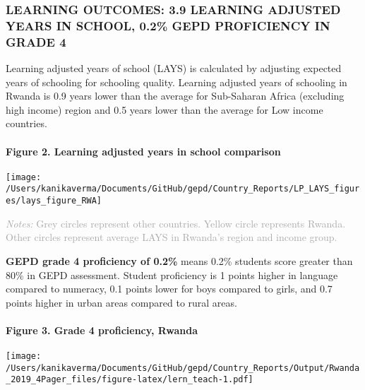 \documentclass[
  twocolumn]{article}
\begin{document}
\hypertarget{learning-outcomes-3.9-learning-adjusted-years-in-school-0.2-gepd-proficiency-in-grade-4}{%
\subsubsection{\texorpdfstring{\textbf{LEARNING OUTCOMES: 3.9 LEARNING
ADJUSTED YEARS IN SCHOOL, 0.2\% GEPD PROFICIENCY IN GRADE
4}}{LEARNING OUTCOMES: 3.9 LEARNING ADJUSTED YEARS IN SCHOOL, 0.2\% GEPD PROFICIENCY IN GRADE 4}}\label{learning-outcomes-3.9-learning-adjusted-years-in-school-0.2-gepd-proficiency-in-grade-4}}

Learning adjusted years of school (LAYS) is calculated by adjusting
expected years of schooling for schooling quality. Learning adjusted
years of schooling in Rwanda is 0.9 years lower than the average for
Sub-Saharan Africa (excluding high income) region and 0.5 years lower
than the average for Low income countries.

\hypertarget{figure-2.-learning-adjusted-years-in-school-comparison}{%
\paragraph{Figure 2. Learning adjusted years in school
comparison}\label{figure-2.-learning-adjusted-years-in-school-comparison}}

\texttt{[image: /Users/kanikaverma/Documents/GitHub/gepd/Country\_Reports/LP\_LAYS\_figures/lays\_figure\_RWA]}

{\scriptsize
    \textcolor{darkgray}{\textit{Notes:} Grey circles represent other countries. Yellow circle represents Rwanda. Other circles represent average LAYS in Rwanda's region and income group.}
  }

\textbf{GEPD grade 4 proficiency of 0.2\%} means 0.2\% students score
greater than 80\% in GEPD assessment. Student proficiency is 1 points
higher in language compared to numeracy, 0.1 points lower for boys
compared to girls, and 0.7 points higher in urban areas compared to
rural areas. \vfill\null

\hypertarget{figure-3.-grade-4-proficiency-rwanda}{%
\paragraph{Figure 3. Grade 4 proficiency,
Rwanda}\label{figure-3.-grade-4-proficiency-rwanda}}

\texttt{[image: /Users/kanikaverma/Documents/GitHub/gepd/Country\_Reports/Output/Rwanda\_2019\_4Pager\_files/figure-latex/lern\_teach-1.pdf]}
\end{document}

